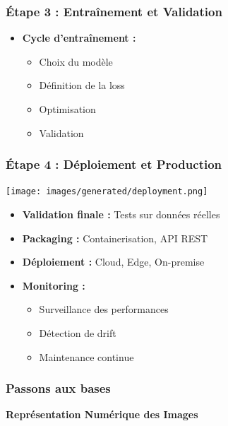 \documentclass{beamer}
\begin{document}
\begin{frame}
    \frametitle{Étape 3 : Entraînement et Validation}
    \begin{itemize}
        \item \textbf{Cycle d'entraînement :}
        \begin{itemize}
            \item Choix du modèle
            \item Définition de la loss
            \item Optimisation
            \item Validation
        \end{itemize}
    \end{itemize}
\end{frame}

\begin{frame}
    \frametitle{Étape 4 : Déploiement et Production}
    \begin{center}
        \texttt{[image: images/generated/deployment.png]}
    \end{center}
    \begin{itemize}
        \item \textbf{Validation finale :} Tests sur données réelles
        \item \textbf{Packaging :} Containerisation, API REST
        \item \textbf{Déploiement :} Cloud, Edge, On-premise
        \item \textbf{Monitoring :} 
        \begin{itemize}
            \item Surveillance des performances
            \item Détection de drift
            \item Maintenance continue
        \end{itemize}
    \end{itemize}
\end{frame}

\begin{frame}
    \frametitle{Passons aux bases}
    \begin{center}
        \Huge{\textbf{Représentation Numérique des Images}}
    \end{center}
\end{frame}

\end{document}
